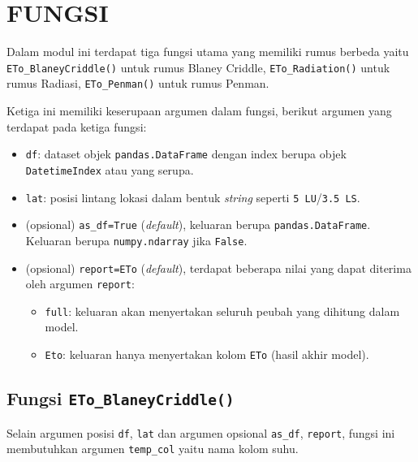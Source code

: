 \documentclass[11pt]{article}
\providecommand{\tightlist}{%
      \setlength{\itemsep}{0pt}\setlength{\parskip}{0pt}}
\begin{document}
    \hypertarget{fungsi}{%
\section{FUNGSI}\label{fungsi}}

Dalam modul ini terdapat tiga fungsi utama yang memiliki rumus berbeda
yaitu \texttt{ETo\_BlaneyCriddle()} untuk rumus Blaney Criddle,
\texttt{ETo\_Radiation()} untuk rumus Radiasi, \texttt{ETo\_Penman()}
untuk rumus Penman.

Ketiga ini memiliki keserupaan argumen dalam fungsi, berikut argumen
yang terdapat pada ketiga fungsi:

\begin{itemize}
\tightlist
\item
  \texttt{df}: dataset objek \texttt{pandas.DataFrame} dengan index
  berupa objek \texttt{DatetimeIndex} atau yang serupa.
\item
  \texttt{lat}: posisi lintang lokasi dalam bentuk \emph{string} seperti
  \texttt{5\ LU}/\texttt{3.5\ LS}.
\item
  (opsional) \texttt{as\_df=True} (\emph{default}), keluaran berupa
  \texttt{pandas.DataFrame}. Keluaran berupa \texttt{numpy.ndarray} jika
  \texttt{False}.
\item
  (opsional) \texttt{report=\textquotesingle{}ETo\textquotesingle{}}
  (\emph{default}), terdapat beberapa nilai yang dapat diterima oleh
  argumen \texttt{report}:

  \begin{itemize}
  \tightlist
  \item
    \texttt{full}: keluaran akan menyertakan seluruh peubah yang
    dihitung dalam model.
  \item
    \texttt{Eto}: keluaran hanya menyertakan kolom \texttt{ETo} (hasil
    akhir model).
  \end{itemize}
\end{itemize}

    \hypertarget{fungsi-eto_blaneycriddle}{%
\subsection{\texorpdfstring{Fungsi
\texttt{ETo\_BlaneyCriddle()}}{Fungsi ETo\_BlaneyCriddle()}}\label{fungsi-eto_blaneycriddle}}

Selain argumen posisi \texttt{df}, \texttt{lat} dan argumen opsional
\texttt{as\_df}, \texttt{report}, fungsi ini membutuhkan argumen
\texttt{temp\_col} yaitu nama kolom suhu.
\end{document}
